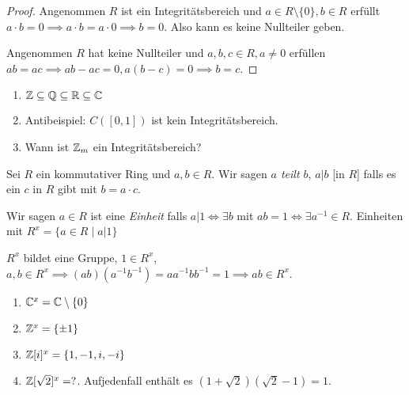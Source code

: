 \begin{proof}
	Angenommen $R$ ist ein Integritätsbereich und $a \in R \setminus \{0\}, b \in R$ erfüllt $a\cdot b = 0 \implies a\cdot b = a\cdot 0 \implies b = 0$.
	Also kann es keine Nullteiler geben.

	Angenommen $R$ hat keine Nullteiler und $a,b,c \in R, a \neq 0$ erfüllen $ab = ac \implies ab - ac = 0, a(b-c) = 0 \implies b = c$.
\end{proof}

\begin{eg}
	\begin{enumerate}
		\item $\mathbb{Z} \subseteq \mathbb{Q} \subseteq \mathbb{R} \subseteq \mathbb{C}$ 
		\item Antibeispiel: $C([0,1])$ ist kein Integritätsbereich.
		\item Wann ist $\mathbb{Z}_{m}$ ein Integritätsbereich?
	\end{enumerate}
\end{eg}

\begin{definition}
	Sei $R$ ein kommutativer Ring und  $a,b \in R$.
	Wir sagen \emph{$a$ teilt  $b$}, $a \vert b$ [in $R$] falls es ein $c$ in $R$ gibt mit $b = a \cdot c$.
\end{definition}

\begin{definition}
	Wir sagen $a \in R$ ist eine \emph{Einheit} falls $a \vert 1 \Leftrightarrow \exists b	$ mit $ab = 1 \Leftrightarrow \exists a^{-1} \in R$.
	Einheiten mit $R^{x} = \{a \in R \mid a \vert 1\} $
\end{definition}

\begin{remark}
	$R^{x}$ bildet eine Gruppe, $1 \in R^{x}$, $a,b \in R^{x} \implies (ab)(a^{-1} b^{-1}) = a a^{-1} b b^{-1} = 1 \implies a b \in R^{x}$.
\end{remark}

\begin{eg}
	\begin{enumerate}
		\item $\mathbb{C}^{x} = \mathbb{C} \setminus \{0\}$ 
		\item $\mathbb{Z}^{x} = \{\pm 1\}$ 
		\item $\mathbb{Z}[i]^{x} = \{1,-1, i, -i\} $ 
		\item $\mathbb{Z}[\sqrt{2}]^{x} = ?$. Aufjedenfall enthält es $(1+\sqrt{2})(\sqrt{2} -1) = 1$.
	\end{enumerate}
\end{eg}

